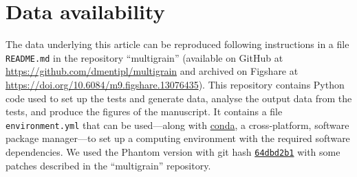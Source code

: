 \documentclass[fleqn,usenatbib]{mnras}
\begin{document}
\section*{Data availability}

The data underlying this article can be reproduced following instructions in a
file \texttt{README.md} in the repository ``multigrain'' (available on GitHub at
\url{https://github.com/dmentipl/multigrain} and archived on Figshare at
\url{https://doi.org/10.6084/m9.figshare.13076435}). This repository contains
Python code used to set up the tests and generate data, analyse the output data
from the tests, and produce the figures of the manuscript. It contains a file
\texttt{environment.yml} that can be used---along with
\href{https://conda.io/}{conda}, a cross-platform, software package manager---to
set up a computing environment with the required software dependencies. We used
the Phantom version with git hash
\href{https://github.com/danieljprice/phantom/commit/64dbd2b124ca74051eed920d6cad0a2e83157478}{\texttt{64dbd2b1}}
with some patches described in the ``multigrain'' repository.














\bsp %
\label{lastpage}
\end{document}

